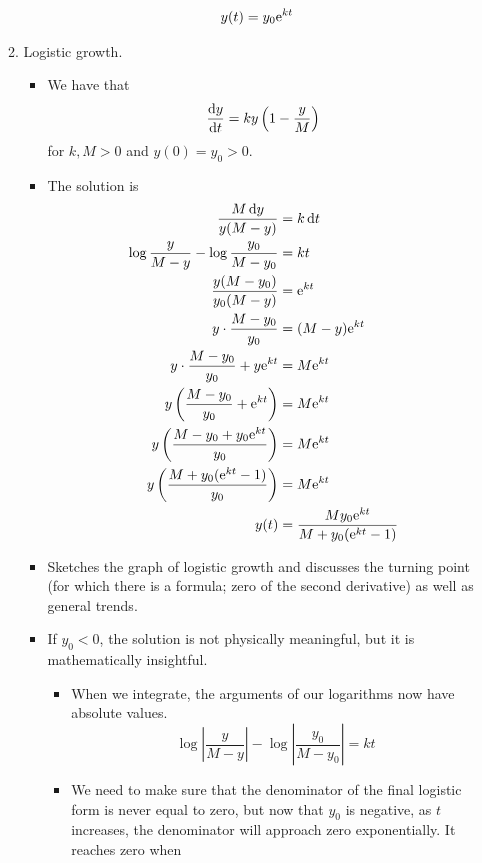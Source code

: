 \documentclass[../notes.tex]{subfiles}
\begin{document}
\begin{itemize}
\begin{enumerate}
\begin{itemize}
\begin{align*}
                y(t) &= y_0\e[kt]
            \end{align*}
        \end{itemize}
        \item Logistic growth.
        \begin{itemize}
            \item We have that
            \begin{equation*}
                \dv{y}{t} = ky\left( 1-\frac{y}{M} \right)
            \end{equation*}
            for $k,M>0$ and $y(0)=y_0>0$.
            \item The solution is
            \begin{align*}
                \frac{M\dd{y}}{y(M-y)} &= k\dd{t}\\
                \log\frac{y}{M-y}-\log\frac{y_0}{M-y_0} &= kt\\
                \frac{y(M-y_0)}{y_0(M-y)} &= \e[kt]\\
                y\cdot\frac{M-y_0}{y_0} &= (M-y)\e[kt]\\
                y\cdot\frac{M-y_0}{y_0}+y\e[kt] &= M\e[kt]\\
                y\left( \frac{M-y_0}{y_0}+\e[kt] \right) &= M\e[kt]\\
                y\left( \frac{M-y_0+y_0\e[kt]}{y_0} \right) &= M\e[kt]\\
                y\left( \frac{M+y_0(\e[kt]-1)}{y_0} \right) &= M\e[kt]\\
                y(t) &= \frac{My_0\e[kt]}{M+y_0(\e[kt]-1)}
            \end{align*}
            \item Sketches the graph of logistic growth and discusses the turning point (for which there is a formula; zero of the second derivative) as well as general trends.
            \item If $y_0<0$, the solution is not physically meaningful, but it is mathematically insightful.
            \begin{itemize}
                \item When we integrate, the arguments of our logarithms now have absolute values.
                \begin{equation*}
                    \log\left| \frac{y}{M-y} \right|-\log\left| \frac{y_0}{M-y_0} \right| = kt
                \end{equation*}
                \item We need to make sure that the denominator of the final logistic form is never equal to zero, but now that $y_0$ is negative, as $t$ increases, the denominator will approach zero exponentially. It reaches zero when

\end{itemize}
\end{itemize}
\end{enumerate}
\end{itemize}
\end{document}
